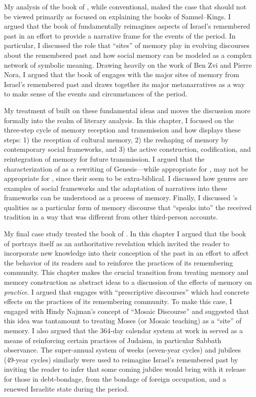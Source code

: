 My analysis of the book of \chronicles, while conventional, maked the case that \chronicles should not be viewed primarily as focused on explaining the books of Samuel--Kings. I argued that the book of \chronicles fundamentally reimagines aspects of Israel's remembered past in an effort to provide a narrative frame for the events of the \secondtemple period. In particular, I discussed the role that ``sites'' of memory play in evolving discourses about the remembered past and how social memory can be modeled as a complex network of symbolic meaning.  Drawing heavily on the work of Ben Zvi and Pierre Nora, I argued that the book of \chronicles engages with the major sites of memory from Israel's remembered past and draws together its major metanarratives as a way to make sense of the events and circumstances of the \secondtemple period.

My treatment of \ga built on these fundamental ideas and moves the discussion more formally into the realm of literary analysis. In this chapter, I focused on the three-step cycle of memory reception and transmission and how \ga displays these steps: 1) the reception of cultural memory, 2) the reshaping of memory by contemporary social frameworks, and 3) the active construction, codification, and reintegration of memory for future transmission. I argued that the characterization of \ga as a rewriting of Genesis---while appropriate for , may not be appropriate for , since their \vorlagen seem to be extra-biblical. I discussed how genres are examples of social frameworks and the adaptation of \ga narratives into these frameworks can be understood as a process of memory. Finally, I discussed \ga's \psgraphical qualities as a particular form of memory discourse that ``speaks into'' the received tradition in a way that was different from other third-person accounts.

My final case study treated the book of \jub. In this chapter I argued that the book of \jub portrays itself as an authoritative revelation which invited the reader to incorporate new knowledge into their conception of the past in an effort to affect the behavior of its readers and to reinforce the practices of its remembering community. This chapter makes the crucial transition from treating memory and memory construction as abstract ideas to a discussion of the effects of memory on \emph{practice}. I argued that \jub engages with ``prescriptive discourses'' which had concrete effects on the practices of its remembering community. To make this case, I engaged with Hindy Najman's concept of ``Mosaic Discourse'' and suggested that this idea was tantamount to treating Moses (or Mosaic teaching) as a ``site'' of memory. I also argued that the 364-day calendar system at work in \jub served as a means of reinforcing certain practices of \secondtemple Judaism, in particular Sabbath observance. The super-annual system of weeks (seven-year cycles) and jubilees (49-year cycles) similarly were used to reimagine Israel's remembered past by inviting the reader to infer that some coming jubilee would bring with it release for those in debt-bondage, from the bondage of foreign occupation, and a renewed Israelite state during the \secondtemple period.

